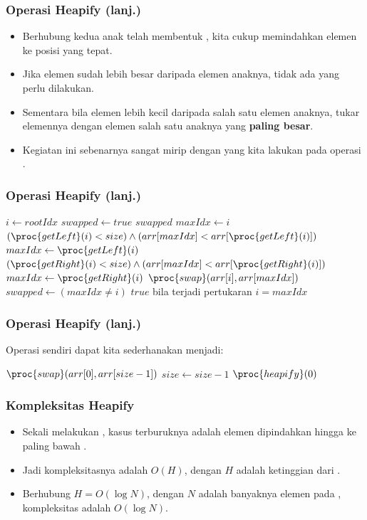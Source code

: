 \begin{frame}
\frametitle{Operasi Heapify (lanj.)}
\begin{itemize}
  \item Berhubung kedua anak telah membentuk \pheap, kita cukup memindahkan elemen  ke posisi yang tepat.
  \item Jika elemen  sudah lebih besar daripada elemen anaknya, tidak ada yang perlu dilakukan.
  \item Sementara bila elemen  lebih kecil daripada salah satu elemen anaknya, tukar elemennya dengan elemen salah satu anaknya yang \textbf{paling besar}.
  \item Kegiatan ini sebenarnya sangat mirip dengan yang kita lakukan pada operasi .
\end{itemize}
\end{frame}

\begin{frame}
\frametitle{Operasi Heapify (lanj.)}
\begin{codebox}
\li $i \gets rootIdx$
\li $swapped \gets true$
\li \While $swapped$  \Do
\li   $maxIdx \gets i$
\li   \If $(\proc{getLeft}(i) < size) \land (arr[maxIdx] < arr[\proc{getLeft}(i)])$ \Then
\li     $maxIdx \gets \proc{getLeft}(i)$
      \End
\li   \If $(\proc{getRight}(i) < size) \land (arr[maxIdx] < arr[\proc{getRight}(i)])$ \Then
\li     $maxIdx \gets \proc{getRight}(i)$
      \End
\li   $\proc{swap}(arr[i], arr[maxIdx])$
\li   $swapped \gets (maxIdx \ne i)$ 
\Comment $true$ bila terjadi pertukaran
\li   $i = maxIdx$
    \End
\end{codebox}
\end{frame}

\begin{frame}
\frametitle{Operasi Heapify (lanj.)}
Operasi  sendiri dapat kita sederhanakan menjadi:
\begin{codebox}
\li $\proc{swap}(arr[0], arr[size-1])$
\li $size \gets size - 1$
\li $\proc{heapify}(0)$
\end{codebox}
\end{frame}

\begin{frame}
\frametitle{Kompleksitas Heapify}
\begin{itemize}
  \item Sekali melakukan , kasus terburuknya adalah elemen  dipindahkan hingga ke paling bawah \ftree.
  \item Jadi kompleksitasnya adalah $O(H)$, dengan $H$ adalah ketinggian dari .
  \item Berhubung $H = O(\log{N})$, dengan $N$ adalah banyaknya elemen pada \pheap, kompleksitas  adalah $O(\log{N})$.
\end{itemize}
\end{frame}

